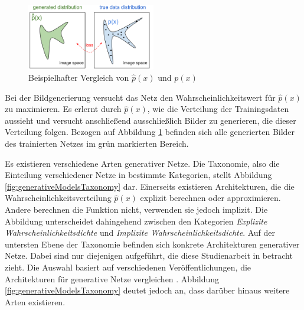 \begin{figure}[H]
   \centering
   \includegraphics[width=0.5\textwidth]{images/Generative Networks/p(x) Distribution.png}
   \caption{Beispielhafter Vergleich von $\hat{p}(x)$ und $p(x)$ \cite{openAiGenerativeNets}}
   \label{fig:generativeNetsPx}
\end{figure}

Bei der Bildgenerierung versucht das Netz den Wahrscheinlichkeitswert für $\hat{p}(x)$ zu maximieren. Es erlernt durch $\hat{p}(x)$, wie die Verteilung der Trainingsdaten aussieht und versucht anschließend ausschließlich Bilder zu generieren, die dieser Verteilung folgen. Bezogen auf Abbildung \ref{fig:generativeNetsPx} befinden sich alle generierten Bilder des trainierten Netzes im grün markierten Bereich. \cite{generative-modellierung} \cite{openAiGenerativeNets}

Es existieren verschiedene Arten generativer Netze. Die Taxonomie, also die Einteilung verschiedener Netze in bestimmte Kategorien, stellt Abbildung \ref{fig:generativeModelsTaxonomy} dar. Einerseits existieren Architekturen, die die Wahrscheinlichkeitsverteilung $\hat{p}(x)$ explizit berechnen oder approximieren. Andere berechnen die Funktion nicht, verwenden sie jedoch implizit. Die Abbildung unterscheidet dahingehend zwischen den Kategorien \emph{Explizite Wahrscheinlichkeitsdichte} und \emph{Implizite Wahrscheinlichkeitsdichte}. Auf der untersten Ebene der Taxonomie befinden sich konkrete Architekturen generativer Netze. Dabei sind nur diejenigen aufgeführt, die diese Studienarbeit in betracht zieht. Die Auswahl basiert auf verschiedenen Veröffentlichungen, die Architekturen für generative Netze vergleichen \cite{generative-models-comparison} \cite{generativeModelsSurvey}. Abbildung \ref{fig:generativeModelsTaxonomy} deutet jedoch an, dass darüber hinaus weitere Arten existieren. \cite{generativeModelsBook}

